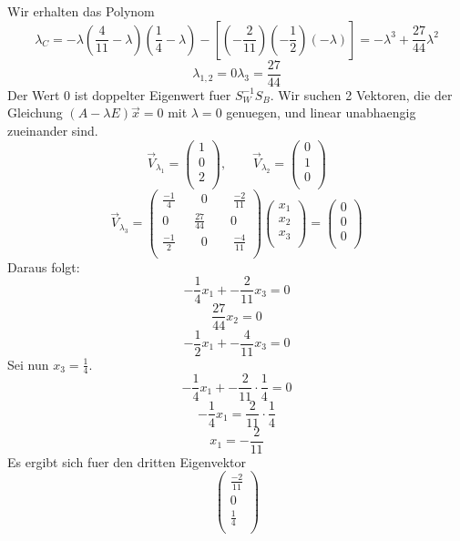 Wir erhalten das Polynom
\[
\lambda_C = -\lambda (\frac{4}{11} - \lambda)(\frac{1}{4} - \lambda)
- [ (-\frac{2}{11}) (-\frac{1}{2}) (-\lambda) ] = - \lambda^3 + \frac{27}{44} \lambda^2
\]
\[
\lambda_{1,2} = 0
\lambda_3 = \frac{27}{44}
\]
Der Wert $0$ ist doppelter Eigenwert fuer $S_W^{-1}S_B$. Wir suchen 2 Vektoren,
die der Gleichung $(A - \lambda E) \vec{x} = 0$ mit $\lambda = 0$ genuegen, und linear 
unabhaengig zueinander sind.
\[
\vec{V}_{\lambda_{1}} = 
\left(
\begin {array} {c}
1  \\
0  \\
2  \\
\end {array}
\right)
, \qquad
\vec{V}_{\lambda_{2}} = 
\left(
\begin {array} {c}
0  \\
1  \\
0  \\
\end {array}
\right)
\]
\[
\vec{V}_{\lambda_{3}} =
\left(
\begin {array} {c}
\frac{-1}{4} \qquad 0 \qquad \frac{-2}{11}  \\
0 \qquad \frac{27}{44} \qquad 0  \\
\frac{-1}{2} \qquad 0 \qquad \frac{-4}{11}  \\
\end {array}
\right)
\left(
\begin {array} {c}
x_1  \\
x_2  \\
x_3  \\
\end {array}
\right)
= 
\left(
\begin {array} {c}
0  \\
0  \\
0  \\
\end {array}
\right)
\]
Daraus folgt:
\[
-\frac{1}{4} x_1 + -\frac{2}{11} x_3 = 0 
\]
\[
\frac{27}{44} x_2 = 0
\]
\[
-\frac{1}{2} x_1 + -\frac{4}{11} x_3 = 0
\]
Sei nun $x_3 = \frac{1}{4}$.
\[
-\frac{1}{4} x_1 + -\frac{2}{11} \cdot \frac{1}{4} = 0 
\]
\[
-\frac{1}{4} x_1 = \frac{2}{11} \cdot \frac{1}{4} 
\]
\[
x_1 = -\frac{2}{11} 
\]
Es ergibt sich fuer den dritten Eigenvektor
\[
\left(
\begin {array} {c}
\frac{-2}{11}  \\
0  \\
\frac{1}{4}  \\
\end {array}
\right)
\]
